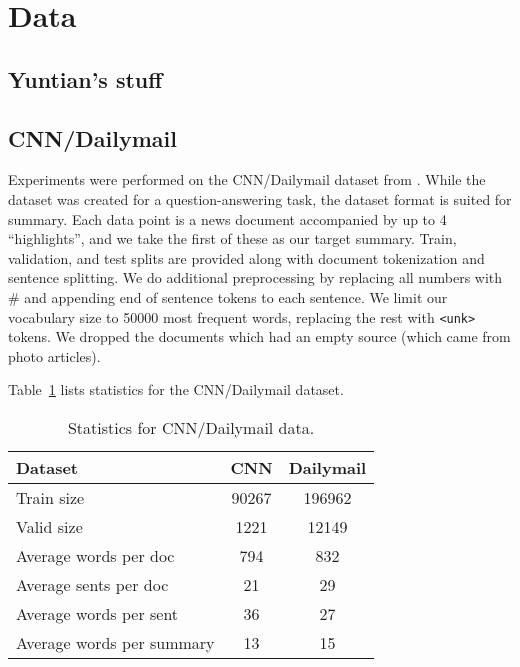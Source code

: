 \documentclass[11pt]{report}
\begin{document}
\section{Data}

\subsection{Yuntian's stuff}


\subsection{CNN/Dailymail}

Experiments were performed on the CNN/Dailymail dataset from \cite{hermann2015read}. While the dataset was created for a question-answering task, the dataset format is suited for summary. Each data point is a news document accompanied by up to 4 ``highlights'', and we take the first of these as our target summary. Train, validation, and test splits are provided along with document tokenization and sentence splitting. We do additional preprocessing by replacing all numbers with \# and appending end of sentence tokens to each sentence. We limit our vocabulary size to 50000 most frequent words, replacing the rest with \texttt{<unk>} tokens. We dropped the documents which had an empty source (which came from photo articles).

 Table~\ref{data_stats} lists statistics for the CNN/Dailymail dataset.

\begin{table}[h]
\centering
\begin{tabular}{lcc}
\toprule
Dataset  & CNN & Dailymail \\
\midrule
Train size & 90267 & 196962 \\
Valid size & 1221 & 12149 \\
Average words per doc & 794 & 832\\
Average sents per doc & 21 & 29\\
Average words per sent & 36 & 27\\
Average words per summary & 13 & 15 \\
\bottomrule
\end{tabular}
\caption{Statistics for CNN/Dailymail data.}
\label{data_stats}
\end{table}

\end{document}
